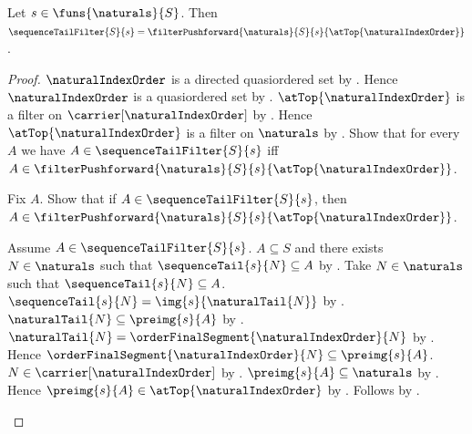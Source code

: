 \begin{theorem}\label{sequence_tail_filter_is_pushforward_at_top}
    Let $s\in\funs{\naturals}{S}$.
    Then $\sequenceTailFilter{S}{s}
        =\filterPushforward{\naturals}{S}{s}{\atTop{\naturalIndexOrder}}$.
\end{theorem}
\begin{proof}
    $\naturalIndexOrder$ is a directed quasiordered set by
        .
    Hence $\naturalIndexOrder$ is a quasiordered set by
        .
    $\atTop{\naturalIndexOrder}$ is a filter on
        $\carrier[\naturalIndexOrder]$ by .
    Hence $\atTop{\naturalIndexOrder}$ is a filter on $\naturals$ by
        .
    Show that for every $A$ we have
        $A\in\sequenceTailFilter{S}{s}$ iff
        $A\in\filterPushforward{\naturals}{S}{s}
            {\atTop{\naturalIndexOrder}}$.
    \begin{subproof}
        Fix $A$.
        Show that if $A\in\sequenceTailFilter{S}{s}$, then
            $A\in\filterPushforward{\naturals}{S}{s}
                {\atTop{\naturalIndexOrder}}$.
        \begin{subproof}
            Assume $A\in\sequenceTailFilter{S}{s}$.
            $A\subseteq S$ and there exists $N\in\naturals$ such that
                $\sequenceTail{s}{N}\subseteq A$ by
                .
            Take $N\in\naturals$ such that
                $\sequenceTail{s}{N}\subseteq A$.
            $\sequenceTail{s}{N}=\img{s}{\naturalTail{N}}$ by
                .
            $\naturalTail{N}\subseteq\preimg{s}{A}$ by
                .
            $\naturalTail{N}
                =\orderFinalSegment{\naturalIndexOrder}{N}$ by
                .
            Hence $\orderFinalSegment{\naturalIndexOrder}{N}
                \subseteq\preimg{s}{A}$.
            $N\in\carrier[\naturalIndexOrder]$ by
                .
            $\preimg{s}{A}\subseteq\naturals$ by
                .
            Hence $\preimg{s}{A}\in\atTop{\naturalIndexOrder}$ by
                .
            Follows by .
        \end{subproof}


\end{subproof}
\end{proof}

